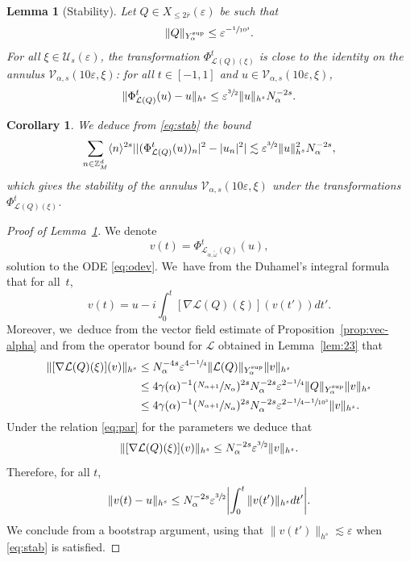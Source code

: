 \documentclass[10pt,a4paper]{amsart}
\theoremstyle{plain}
\newtheorem{corollary}[theorem]{Corollary}
\newtheorem{lemma}[theorem]{Lemma}
\theoremstyle{definition}
\newcommand{\Z}{\mathbb{Z}}
\newcommand{\1}{\mathbf{1}}
\newcommand{\Ysup}[1]{Y_{#1}^{\mathrm{sup}}}
\let\epsilon\varepsilon
\begin{document}
\begin{lemma}[Stability]\label{lem:stab} Let $Q\in X_{\leq2\overline{r}}(\epsilon)$ be such that
\begin{equation}
\label{eq:ass-Q}
\|Q\|_{\Ysup{\alpha}}
\leq \epsilon^{-\sfrac{1}{10^{3}}}.
\end{equation}
For all $\xi\in\mathcal{U}_{s}(\epsilon)$, the transformation $\Phi_{\mathcal{L}(Q)(\xi)}^{t}$ is close to the identity on the annulus $\mathcal{V}_{\alpha,s}(10\epsilon,\xi)$: for all $t\in[-1,1]$ and $u\in\mathcal{V}_{\alpha,s}(10\epsilon,\xi)$,
\begin{equation}
\label{eq:stab}
\|\Phi_{\mathcal{L}(Q)}^{t}(u)-u\|_{h^{s}}
\leq\epsilon^{\sfrac{3}{2}}\|u\|_{h^{s}}N_{\alpha}^{-2s}.
\end{equation}
\end{lemma}
\begin{corollary}
We deduce from \eqref{eq:stab} the bound
\begin{equation}
\label{eq:stab-a}
\sum_{n\in\Z_{M}^{d}}\langle n\rangle^{2s}||(\Phi_{\mathcal{L}(Q)}^{t}(u))_{n}|^{2}-|u_{n}|^{2}|
\lesssim \epsilon^{\sfrac{3}{2}}\|u\|_{h^{s}}^{2}N_{\alpha}^{-2s},
\end{equation}
which gives the stability of the annulus $\mathcal{V}_{\alpha,s}(10\epsilon,\xi)$ under the transformations $\Phi_{\mathcal{L}(Q)(\xi)}^{t}$.
\end{corollary}

\begin{proof}[Proof of Lemma~\ref{lem:stab}] We denote
\[
v(t) = \Phi_{\mathcal{L}_{\alpha,\widetilde{\omega}}(Q)}^t(u),
\]
solution to the ODE \eqref{eq:odev}. We~have from the Duhamel's integral formula that for all~$t$,
\[
v(t) = u - i\int_{0}^{t}[\nabla\mathcal{L}(Q)(\xi)](v(t'))dt'.
\]
Moreover, we~deduce from the vector field estimate of Proposition~\ref{prop:vec-alpha} and from the operator bound for $\mathcal{L}$ obtained in Lemma~\ref{lem:23} that
\begin{align*}
\|[\nabla \mathcal{L}(Q)(\xi)](v)\|_{h^{s}}
&\leq
N_{\alpha}^{-4s}\epsilon^{4-\sfrac{1}{4}}
\|
\mathcal{L}(Q)
\|_{\Ysup{\alpha}}
\|
v
\|_{h^{s}} \\
&\leq
4\gamma(\alpha)^{-1}(\sfrac{N_{\alpha+1}}{N_{\alpha}})^{2s}N_{\alpha}^{-2s}\epsilon^{2-\sfrac{1}{4}}
\|
Q
\|_{\Ysup{\alpha}}
\|v
\|_{h^{s}} \\
&\leq
4\gamma(\alpha)^{-1}(\sfrac{N_{\alpha+1}}{N_{\alpha}})^{2s}N_{\alpha}^{-2s}\epsilon^{2-\sfrac{1}{4}-\sfrac{1}{10^{3}}}
\|v
\|_{h^{s}} .
\end{align*}
Under the relation \eqref{eq:par} for the parameters we deduce that
\[
\|[\nabla \mathcal{L}(Q)(\xi)](v)\|_{h^{s}}
\leq N_{\alpha}^{-2s}\epsilon^{\sfrac{3}{2}}\|v\|_{h^{s}}.
\]
Therefore, for all $t$,
\[
\|v(t)-u\|_{h^{s}} \leq N_{\alpha}^{-2s}\epsilon^{\sfrac{3}{2}} \biggl|\int_{0}^{t}\|v(t')\|_{h^{s}}dt'\biggr|.
\]
We conclude from a bootstrap argument, using that $\|v(t')\|_{h^{s}}\lesssim\epsilon$ when \eqref{eq:stab} is satisfied.
\end{proof}
\end{document}
